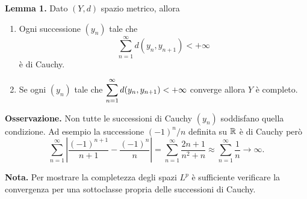 \hypertarget{prop:completeness_lemma_1}{}
\textbf{Lemma 1.} 
Dato $(Y, d)$ spazio metrico, allora
\begin{enumerate}
	\item
		Ogni successione $(y_n)$ tale che
		$$
		\sum^{\infty}_{n=1} d(y_n, y_{n+1}) < +\infty
		$$
		è di Cauchy.

	\item \label{item:def_completeness_1}
		Se ogni $(y_n)$ tale che $\displaystyle \sum^{\infty}_{n=1} d(y_n, y_{n+1}) < +\infty$ converge allora $Y$ è completo.
\end{enumerate}

\textbf{Osservazione.} Non tutte le successioni di Cauchy $(y_n)$ soddisfano quella condizione. Ad esempio la successione $(-1)^n / n$ definita su $\mathbb R$ è di Cauchy però
$$
\sum_{n=1}^\infty \left| \frac{(-1)^{n+1}}{n+1} - \frac{(-1)^n}{n} \right| 
= \sum_{n=1}^\infty \frac{2n + 1}{n^2 + n}
\approx \sum_{n=1}^\infty \frac{1}{n} \to \infty.
$$

\textbf{Nota.} Per mostrare la completezza degli spazi $L^p$ è sufficiente verificare la convergenza per una sottoclasse propria delle successioni di Cauchy.


